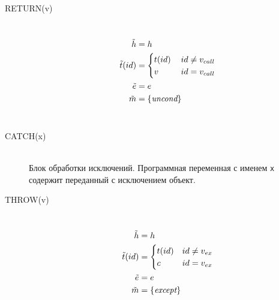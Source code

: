 \begin{description}
  \item[{\small\ttfamily RETURN(v)}] ~\\%
  \[
  \begin{aligned}
    \tilde{h} &= h\\
    \tilde{t}(id) &= 
      \begin{cases}
	t(id) &\: id \neq v_{call} \\
	v &\: id = v_{call} \\
      \end{cases}\\
    \tilde{e} &= e \\
    \tilde{m} &= \{\emph{uncond}\} \\
  \end{aligned}
  \]
  \\
   
  \item[{\small\ttfamily CATCH(x)}] ~\\%
  Блок обработки исключений. Программная переменная с именем
  \texttt{x} содержит переданный с исключением объект.
  \\
   
  \item[{\small\ttfamily THROW(v)}] ~\\%
  \[
  \begin{aligned}
    \tilde{h} &= h\\
    \tilde{t}(id) &= \begin{cases}
      t(id) & id \neq v_{ex} \\
      c & id = v_{ex} \\
    \end{cases}
    \\
    \tilde{e} &= e\\
    \tilde{m} &= \{\emph{except}\} \\
  \end{aligned}
  \]
  \\
   

\end{description}
